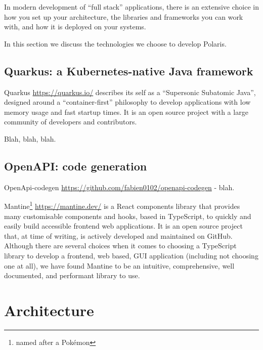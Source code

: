 \documentclass[11pt,twoside]{article}
\begin{document}
In modern development of ``full stack'' applications, there is an extensive choice in how you set up your
architecture, the libraries and frameworks you can work with, and how it is deployed on your systems.

In this section we discuss the technologies we choose to develop Polaris.

\subsection{Quarkus: a Kubernetes-native Java framework}\label{subsec:quarkus}

Quarkus \url{https://quarkus.io/} describes its self as a ``Supersonic Subatomic Java'', designed around a
``container-first'' philosophy to develop applications with low memory usage and fast startup times.
It is an open source project with a large community of developers and contributors.

Blah, blah, blah.

\subsection{OpenAPI: code generation}\label{subsec:openapi-code-generation}

OpenApi-codegen \url{https://github.com/fabien0102/openapi-codegen}  - blah.


Mantine\footnote{named after a Pok\'emon} \url{https://mantine.dev/} is a React components library that
provides many customisable components and hooks, based in TypeScript, to quickly and easily build accessible
frontend web applications.
It is an open source project that, at time of writing, is actively developed and maintained on GitHub.
Although there are several choices when it comes to choosing a TypeScript library to develop a frontend,
web based, GUI application (including not choosing one at all), we have found Mantine to be an intuitive,
comprehensive, well documented, and performant library to use.


\section{Architecture}\label{sec:architecture}
\end{document}
